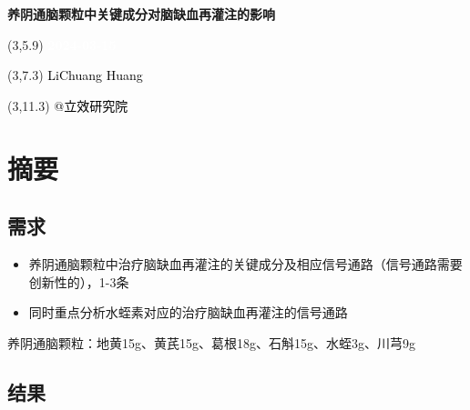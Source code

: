 \documentclass[
]{article}
\author{}
\date{\vspace{-2.5em}}
\providecommand{\tightlist}{%
  \setlength{\itemsep}{0pt}\setlength{\parskip}{0pt}}
\begin{document}
\begin{titlepage} 
\begin{center} \textbf{\Huge
养阴通脑颗粒中关键成分对脑缺血再灌注的影响}
\vspace{4em} \begin{textblock}{10}(3,5.9) \huge
\textbf{\textcolor{white}{2024-03-15}}
\end{textblock} \begin{textblock}{10}(3,7.3)
\Large \textcolor{black}{LiChuang Huang}
\end{textblock} \begin{textblock}{10}(3,11.3)
\Large \textcolor{black}{@立效研究院}
\end{textblock} \end{center} \end{titlepage}
\restoregeometry


\tableofcontents

\listoffigures

\listoftables

\newpage


\hypertarget{abstract}{%
\section{摘要}\label{abstract}}

\hypertarget{ux9700ux6c42}{%
\subsection{需求}\label{ux9700ux6c42}}

\begin{itemize}
\tightlist
\item
  养阴通脑颗粒中治疗脑缺血再灌注的关键成分及相应信号通路（信号通路需要创新性的），1-3条
\item
  同时重点分析水蛭素对应的治疗脑缺血再灌注的信号通路
\end{itemize}

养阴通脑颗粒：地黄15g、黄芪15g、葛根18g、石斛15g、水蛭3g、川芎9g

\hypertarget{ux7ed3ux679c}{%
\subsection{结果}\label{ux7ed3ux679c}}
\end{document}
